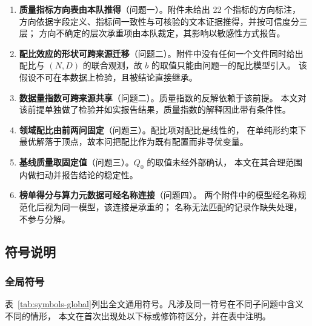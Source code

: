\begin{enumerate}[label=\textbf{B\arabic*.},leftmargin=2.6em,itemsep=2pt]
  \item \textbf{质量指标方向表由本队推得}（问题一）。附件未给出 22 个指标的方向标注，
    方向依据字段定义、指标间一致性与可核验的文本证据推得，并按可信度分三层；
    方向不确定的层次承重项由本队裁定，其影响以敏感性方式报告。
  \item \textbf{配比效应的形状可跨来源迁移}（问题二）。附件中没有任何一个文件同时给出
    配比与 $(N,D)$ 的联合观测，故 $b$ 的取值只能由问题一的配比模型引入。
    该假设不可在本数据上检验，且被结论直接继承。
  \item \textbf{数据量指数可跨来源共享}（问题二）。质量指数的反解依赖于该前提。
    本文对该前提单独做了检验并如实报告结果，质量指数的解释因此带有条件性。
  \item \textbf{领域配比由前两问固定}（问题三）。配比项对配比是线性的，
    在单纯形约束下最优解落于顶点，故本问把配比作为既有配置而非寻优变量。
  \item \textbf{基线质量取固定值}（问题三）。$Q_0$ 的取值未经外部确认，
    本文在其合理范围内做扫动并报告结论的稳定性。
  \item \textbf{榜单得分与算力元数据可经名称连接}（问题四）。
    两个附件中的模型经名称规范化后视为同一模型，该连接是承重的；
    名称无法匹配的记录作缺失处理，不参与分解。
\end{enumerate}

\subsection{符号说明}
\subsubsection{全局符号}
表~\ref{tab:symbols-global}列出全文通用符号。凡涉及同一符号在不同子问题中含义不同的情形，
本文在首次出现处以下标或修饰符区分，并在表中注明。

